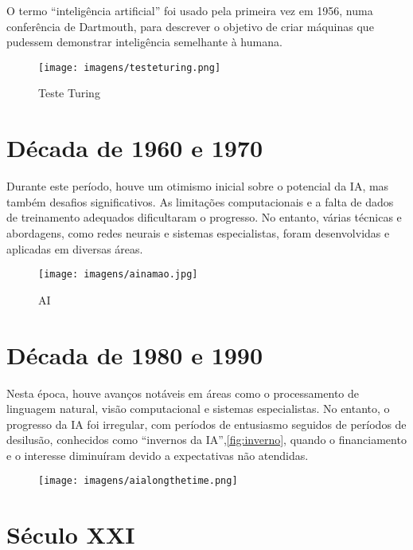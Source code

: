 \documentclass{report}
\begin{document}
O termo “inteligência artificial” foi usado pela primeira vez em 1956, numa conferência de Dartmouth, para descrever o objetivo de criar máquinas que pudessem demonstrar inteligência semelhante à humana.
\begin{figure}[ht]
    \centering
    \texttt{[image: imagens/testeturing.png]}
    \caption{Teste Turing}
    \label{fig:turingtestl}
\end{figure}

\vspace{20pt}

\section{Década de 1960 e 1970}
Durante este período, houve um otimismo inicial sobre o potencial da \ac{IA}, mas também desafios significativos. As limitações computacionais e a falta de dados de treinamento adequados dificultaram o progresso. No entanto, várias técnicas e abordagens, como redes neurais e sistemas especialistas, foram desenvolvidas e aplicadas em diversas áreas.
\begin{figure}[ht]
    \centering
    \texttt{[image: imagens/ainamao.jpg]}
    \caption{AI}
    \label{fig:ainamao}
\end{figure}
\clearpage

\section{Década de 1980 e 1990}

\vspace{10pt}

Nesta época, houve avanços notáveis em áreas como o processamento de linguagem
natural, visão computacional e sistemas especialistas. No entanto, o progresso da \ac{IA} foi irregular, com períodos de entusiasmo seguidos de períodos de desilusão, conhecidos como “invernos da \ac{IA}”,\autoref{fig:inverno}, quando o financiamento e o interesse diminuíram devido a expectativas não atendidas.
\begin{figure}[ht]
    \centering
    \texttt{[image: imagens/aialongthetime.png]}
    \caption{}
    \label{fig:inverno}
\end{figure}

\section{Século XXI}
\vspace{10pt}
\end{document}
